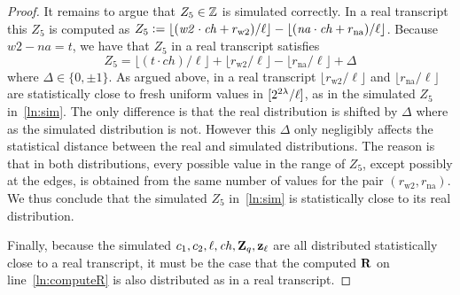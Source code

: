 \documentclass[11pt]{article}
\begin{document}
\begin{proof}
It remains to argue that $Z_5 \in \mathbb Z$ is simulated correctly. 
In a real transcript this $Z_5$ is computed as 
$Z_5 \mathrel{\mathop:}= \lfloor (\mathit{w2} \cdot \mathit{ch} + r_\text{w2})/\ell \rfloor -
          \lfloor (\mathit{na} \cdot \mathit{ch} + r_\text{na})/\ell \rfloor$.
Because $\mathit{w2} - \mathit{na} = t$, we have
that $Z_5$ in a real transcript satisfies
\[    Z_5 = \lfloor (t \cdot \mathit{ch})/\ell \rfloor + \lfloor r_\text{w2} / \ell \rfloor - \lfloor r_\text{na} / \ell \rfloor + \Delta \]
where $\Delta \in \{0, \pm 1\}$. 
As argued above, in a real transcript $\lfloor r_\text{w2} / \ell \rfloor$ 
and $\lfloor r_\text{na} / \ell \rfloor$ 
are statistically close to fresh uniform values in $[{2^{2\lambda}/\ell}]$, 
as in the simulated $Z_5$ in~\eqref{ln:sim}.
The only difference is that the real distribution is shifted by $\Delta$
where as the simulated distribution is not.  
However this $\Delta$ only negligibly affects the statistical distance
between the real and simulated distributions. 
The reason is that in both distributions, 
every possible value in the range of $Z_5$, 
except possibly at the edges, 
is obtained from the same number of values 
for the pair $(r_\text{w2}, r_\text{na})$. 
We thus conclude that the simulated $Z_5$ in~\eqref{ln:sim} 
is statistically close to its real distribution.

Finally, because the simulated $c_1, c_2, \ell, \mathit{ch}, \mathbf{Z}_q, \mathbf{z}_\ell$
are all distributed statistically close to a real transcript, 
it must be the case that the computed $\mathbf{R}$ 
on line~\eqref{ln:computeR} is also distributed as in 
a real transcript. 
\end{proof}
\end{document}
